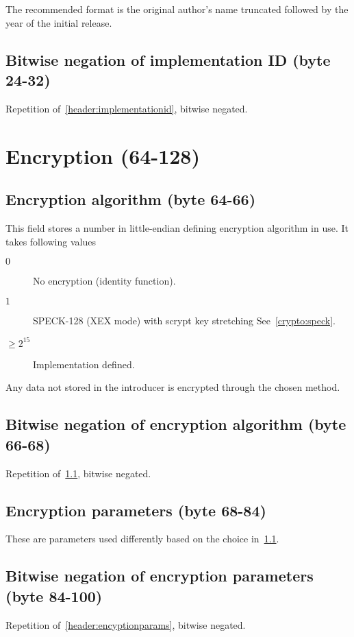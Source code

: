 \documentclass[11pt,a4paper]{report}
\begin{document}
        The recommended format is the original author's name truncated
        followed by the year of the initial release.

        \subsection{Bitwise negation of implementation ID (byte 24-32)}
        Repetition of~\ref{header:implementationid}, bitwise negated.

    \section{Encryption (64-128)}
        \subsection{Encryption algorithm (byte 64-66)}
        \label{header:encryption}
        This field stores a number in little-endian defining encryption
        algorithm in use. It takes following values

        \begin{description}
            \item [$0$] No encryption (identity function).
            \item [$1$] SPECK-128 (XEX mode) with scrypt key stretching
                See~\ref{crypto:speck}.
            \item [$\geq 2^{15}$] Implementation defined.
        \end{description}

        Any data not stored in the introducer is encrypted through the chosen method.

        \subsection{Bitwise negation of encryption algorithm (byte 66-68)}
        Repetition of~\ref{header:encryption}, bitwise negated.

        \subsection{Encryption parameters (byte 68-84)}
        \label{header:encryptionparams}
        These are parameters used differently based on the choice
        in~\ref{header:encryption}.

        \subsection{Bitwise negation of encryption parameters (byte 84-100)}
        Repetition of~\ref{header:encyptionparams}, bitwise negated.
\end{document}
